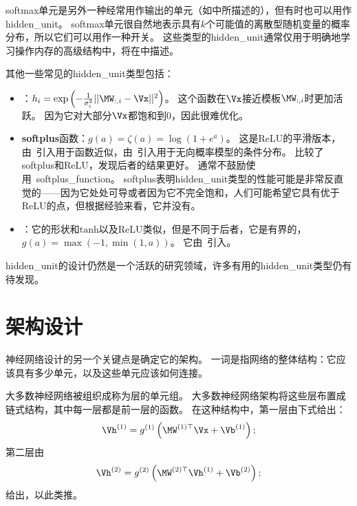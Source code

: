 

softmax单元是另外一种经常用作输出的单元（如中所描述的），但有时也可以用作\gls{hidden_unit}。
softmax单元很自然地表示具有$k$个可能值的离散型随机变量的概率分布，所以它们可以用作一种开关。
这些类型的\gls{hidden_unit}通常仅用于明确地学习操作内存的高级结构中，将在中描述。

其他一些常见的\gls{hidden_unit}类型包括：
\begin{itemize}
\item {}：$h_i = \exp \left (-\frac{1}{\sigma_i^2}|| \MW_{:,i}-\Vx||^2 \right )$。
这个函数在$\Vx$接近模板$\MW_{:,i}$时更加活跃。
因为它对大部分$\Vx$都饱和到0，因此很难优化。

\item \textbf{\gls{softplus}}函数：$g(a)=\zeta(a)=\log(1+e^a)$。
这是\gls{ReLU}的平滑版本，由~\cite{Dugas-et-al-2001}引入用于函数近似，由~\cite{Nair-Hinton-2010}引入用于无向概率模型的条件分布。
\cite{Glorot-et-al-2011a}比较了softplus和\gls{ReLU}，发现后者的结果更好。
通常不鼓励使用~\gls{softplus_function}。
softplus表明\gls{hidden_unit}类型的性能可能是非常反直觉的——因为它处处可导或者因为它不完全饱和，人们可能希望它具有优于\gls{ReLU}的点，但根据经验来看，它并没有。

\item {}：它的形状和$\text{tanh}$以及\gls{ReLU}类似，但是不同于后者，它是有界的，$g(a)=\max(-1, \min(1,a))$。
它由~\cite{Collobert-2004}引入。
\end{itemize}

\gls{hidden_unit}的设计仍然是一个活跃的研究领域，许多有用的\gls{hidden_unit}类型仍有待发现。

\section{架构设计}
\label{sec:architecture_design}

神经网络设计的另一个关键点是确定它的架构。
一词是指网络的整体结构：它应该具有多少单元，以及这些单元应该如何连接。


大多数神经网络被组织成称为层的单元组。
大多数神经网络架构将这些层布置成链式结构，其中每一层都是前一层的函数。
在这种结构中，第一层由下式给出：
\begin{equation}
\Vh^{(1)}= g^{(1)}\left ( \MW^{(1)\top} \Vx + \Vb^{(1)}\right );
\end{equation}
第二层由
\begin{equation}
\Vh^{(2)} = g^{(2)}\left ( \MW^{(2)\top}\Vh^{(1)}+\Vb^{(2)} \right );
\end{equation}
给出，以此类推。

